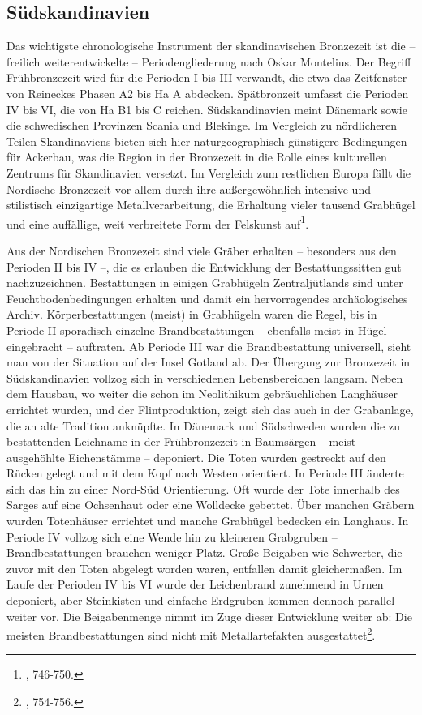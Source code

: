 \documentclass[openany,twoside,twocolumn]{book}
\let\rmarkdownfootnote\footnote%
\def\footnote{\protect\rmarkdownfootnote}
\begin{document}
\hypertarget{sudskandinavien}{%
\subsection{Südskandinavien}\label{sudskandinavien}}

Das wichtigste chronologische Instrument der skandinavischen Bronzezeit
ist die -- freilich weiterentwickelte -- Periodengliederung nach Oskar
Montelius. Der Begriff Frühbronzezeit wird für die Perioden I bis III
verwandt, die etwa das Zeitfenster von Reineckes Phasen A2 bis Ha A
abdecken. Spätbronzeit umfasst die Perioden IV bis VI, die von Ha B1 bis
C reichen. Südskandinavien meint Dänemark sowie die schwedischen
Provinzen Scania und Blekinge. Im Vergleich zu nördlicheren Teilen
Skandinaviens bieten sich hier naturgeographisch günstigere Bedingungen
für Ackerbau, was die Region in der Bronzezeit in die Rolle eines
kulturellen Zentrums für Skandinavien versetzt. Im Vergleich zum
restlichen Europa fällt die Nordische Bronzezeit vor allem durch ihre
außergewöhnlich intensive und stilistisch einzigartige
Metallverarbeitung, die Erhaltung vieler tausend Grabhügel und eine
auffällige, weit verbreitete Form der Felskunst auf\footnote{\textcite{thrane_scandinavia_2013},
  746-750.}.

Aus der Nordischen Bronzezeit sind viele Gräber erhalten -- besonders
aus den Perioden II bis IV --, die es erlauben die Entwicklung der
Bestattungssitten gut nachzuzeichnen. Bestattungen in einigen Grabhügeln
Zentraljütlands sind unter Feuchtbodenbedingungen erhalten und damit ein
hervorragendes archäologisches Archiv. Körperbestattungen (meist) in
Grabhügeln waren die Regel, bis in Periode II sporadisch einzelne
Brandbestattungen -- ebenfalls meist in Hügel eingebracht -- auftraten.
Ab Periode III war die Brandbestattung universell, sieht man von der
Situation auf der Insel Gotland ab. Der Übergang zur Bronzezeit in
Südskandinavien vollzog sich in verschiedenen Lebensbereichen langsam.
Neben dem Hausbau, wo weiter die schon im Neolithikum gebräuchlichen
Langhäuser errichtet wurden, und der Flintproduktion, zeigt sich das
auch in der Grabanlage, die an alte Tradition anknüpfte. In Dänemark und
Südschweden wurden die zu bestattenden Leichname in der Frühbronzezeit
in Baumsärgen -- meist ausgehöhlte Eichenstämme -- deponiert. Die Toten
wurden gestreckt auf den Rücken gelegt und mit dem Kopf nach Westen
orientiert. In Periode III änderte sich das hin zu einer Nord-Süd
Orientierung. Oft wurde der Tote innerhalb des Sarges auf eine
Ochsenhaut oder eine Wolldecke gebettet. Über manchen Gräbern wurden
Totenhäuser errichtet und manche Grabhügel bedecken ein Langhaus. In
Periode IV vollzog sich eine Wende hin zu kleineren Grabgruben --
Brandbestattungen brauchen weniger Platz. Große Beigaben wie Schwerter,
die zuvor mit den Toten abgelegt worden waren, entfallen damit
gleichermaßen. Im Laufe der Perioden IV bis VI wurde der Leichenbrand
zunehmend in Urnen deponiert, aber Steinkisten und einfache Erdgruben
kommen dennoch parallel weiter vor. Die Beigabenmenge nimmt im Zuge
dieser Entwicklung weiter ab: Die meisten Brandbestattungen sind nicht
mit Metallartefakten ausgestattet\footnote{\textcite{thrane_scandinavia_2013},
  754-756.}.
\end{document}
